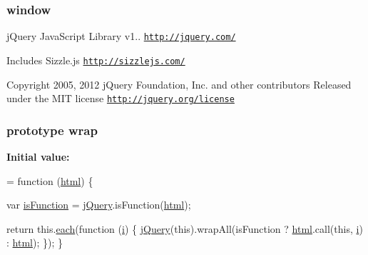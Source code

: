 \subsubsection[{\texorpdfstring{window}{window}}]{\setlength{\rightskip}{0pt plus 5cm}window}\hypertarget{jquery-2_82_81-vsdoc_8js_a04a8a2bbfa9c15500892b8e5033d625b}{}\label{jquery-2_82_81-vsdoc_8js_a04a8a2bbfa9c15500892b8e5033d625b}
j\+Query Java\+Script Library v1.. \href{http://jquery.com/}{\tt http\+://jquery.\+com/}

Includes Sizzle.\+js \href{http://sizzlejs.com/}{\tt http\+://sizzlejs.\+com/}

Copyright 2005, 2012 j\+Query Foundation, Inc. and other contributors Released under the M\+IT license \href{http://jquery.org/license}{\tt http\+://jquery.\+org/license} 
\subsubsection[{\texorpdfstring{wrap}{wrap}}]{ {\bf prototype} wrap}\hypertarget{jquery-2_82_81-vsdoc_8js_a75991b1c3d71522ced1bf65ab3b07902}{}\label{jquery-2_82_81-vsdoc_8js_a75991b1c3d71522ced1bf65ab3b07902}
{\bfseries Initial value\+:}
\begin{DoxyCode}
= \textcolor{keyword}{function} (\hyperlink{jquery-2_82_81-vsdoc_8js_a54a716632718016dd4e400e83a0970e2}{html}) \{
        

        var \hyperlink{jquery-2_82_81-vsdoc_8js_a02aa8413df0c687cbb1cd77943741d5a}{isFunction} = \hyperlink{jquery-2_82_81-vsdoc_8js_add5237586d970a38a81f990e8eb28c6c}{jQuery}.isFunction(\hyperlink{jquery-2_82_81-vsdoc_8js_a54a716632718016dd4e400e83a0970e2}{html});

        \textcolor{keywordflow}{return} this.\hyperlink{jquery-2_82_81-vsdoc_8js_a77da68323b96573f900f8b5dd3a47954}{each}(\textcolor{keyword}{function} (\hyperlink{geolocation-marker_8js_a0325b7ce0988782a8032e720ef3aa411}{i}) \{
            \hyperlink{jquery-2_82_81-vsdoc_8js_add5237586d970a38a81f990e8eb28c6c}{jQuery}(\textcolor{keyword}{this}).wrapAll(isFunction ? \hyperlink{jquery-2_82_81-vsdoc_8js_a54a716632718016dd4e400e83a0970e2}{html}.call(\textcolor{keyword}{this}, \hyperlink{geolocation-marker_8js_a0325b7ce0988782a8032e720ef3aa411}{i}) : 
      \hyperlink{jquery-2_82_81-vsdoc_8js_a54a716632718016dd4e400e83a0970e2}{html});
        \});
    \}
\end{DoxyCode}
